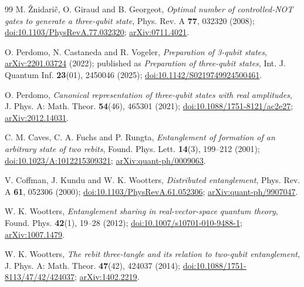 \documentclass[11pt,a4paper]{article}
\theoremstyle{definition}
\theoremstyle{plain}
\begin{document}
\begin{thebibliography}{99}
\setlength{\itemsep}{2pt}
M. \v{Z}nidari\v{c}, O. Giraud and B. Georgeot,
\emph{Optimal number of controlled-NOT gates to generate a three-qubit state},
Phys. Rev. A \textbf{77}, 032320 (2008);
\href{https://doi.org/10.1103/PhysRevA.77.032320}{doi:10.1103/PhysRevA.77.032320};
\href{https://arxiv.org/abs/0711.4021}{arXiv:0711.4021}.

O. Perdomo, N. Castaneda and R. Vogeler,
\emph{Preparation of 3-qubit states},
\href{https://arxiv.org/abs/2201.03724}{arXiv:2201.03724} (2022); published as
\emph{Preparation of three-qubit states},
Int. J. Quantum Inf. \textbf{23}(01), 2450046 (2025);
\href{https://doi.org/10.1142/S0219749924500461}{doi:10.1142/S0219749924500461}.

O. Perdomo,
\emph{Canonical representation of three-qubit states with real amplitudes},
J. Phys. A: Math. Theor. \textbf{54}(46), 465301 (2021);
\href{https://doi.org/10.1088/1751-8121/ac2e27}{doi:10.1088/1751-8121/ac2e27};
\href{https://arxiv.org/abs/2012.14031}{arXiv:2012.14031}.

C. M. Caves, C. A. Fuchs and P. Rungta,
\emph{Entanglement of formation of an arbitrary state of two rebits},
Found. Phys. Lett. \textbf{14}(3), 199--212 (2001);
\href{https://doi.org/10.1023/A:1012215309321}{doi:10.1023/A:1012215309321};
\href{https://arxiv.org/abs/quant-ph/0009063}{arXiv:quant-ph/0009063}.

V. Coffman, J. Kundu and W. K. Wootters,
\emph{Distributed entanglement},
Phys. Rev. A \textbf{61}, 052306 (2000);
\href{https://doi.org/10.1103/PhysRevA.61.052306}{doi:10.1103/PhysRevA.61.052306};
\href{https://arxiv.org/abs/quant-ph/9907047}{arXiv:quant-ph/9907047}.

W. K. Wootters,
\emph{Entanglement sharing in real-vector-space quantum theory},
Found. Phys. \textbf{42}(1), 19--28 (2012);
\href{https://doi.org/10.1007/s10701-010-9488-1}{doi:10.1007/s10701-010-9488-1};
\href{https://arxiv.org/abs/1007.1479}{arXiv:1007.1479}.

W. K. Wootters,
\emph{The rebit three-tangle and its relation to two-qubit entanglement},
J. Phys. A: Math. Theor. \textbf{47}(42), 424037 (2014);
\href{https://doi.org/10.1088/1751-8113/47/42/424037}{doi:10.1088/1751-8113/47/42/424037};
\href{https://arxiv.org/abs/1402.2219}{arXiv:1402.2219}.


\end{thebibliography}
\end{document}

